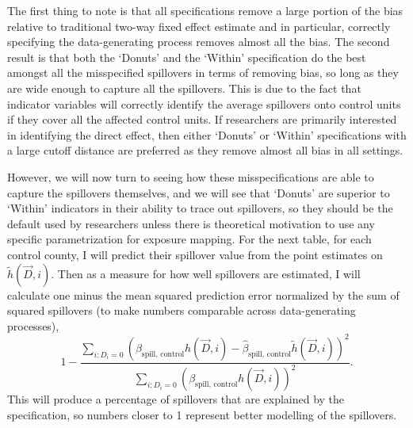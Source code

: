 \documentclass[11pt]{article}
\begin{document}
The first thing to note is that all specifications remove a large portion of the bias relative to traditional two-way fixed effect estimate and in particular, correctly specifying the data-generating process removes almost all the bias. The second result is that both the `Donuts' and the `Within' specification do the best amongst all the misspecified spillovers in terms of removing bias, so long as they are wide enough to capture all the spillovers. This is due to the fact that indicator variables will correctly identify the average spillovers onto control units if they cover all the affected control units. If researchers are primarily interested in identifying the direct effect, then either `Donuts' or `Within' specifications with a large cutoff distance are preferred as they remove almost all bias in all settings. 

However, we will now turn to seeing how these misspecifications are able to capture the spillovers themselves, and we will see that `Donuts' are superior to `Within' indicators in their ability to trace out spillovers, so they should be the default used by researchers unless there is theoretical motivation to use any specific parametrization for exposure mapping. For the next table, for each control county, I will predict their spillover value from the point estimates on $\tilde{h}(\vec{D}, i)$. Then as a measure for how well spillovers are estimated, I will calculate one minus the mean squared prediction error normalized by the sum of squared spillovers (to make numbers comparable across data-generating processes), \[ 
    1 - \frac{\sum_{i: D_i = 0} (\beta_{\text{spill, control}} h(\vec{D}, i) - \hat{\beta}_{\text{spill, control}} \tilde{h}(\vec{D}, i))^2}{\sum_{i: D_i = 0} (\beta_{\text{spill, control}} h(\vec{D}, i))^2}.
\] This will produce a percentage of spillovers that are explained by the specification, so numbers closer to 1 represent better modelling of the spillovers. 
\end{document}
